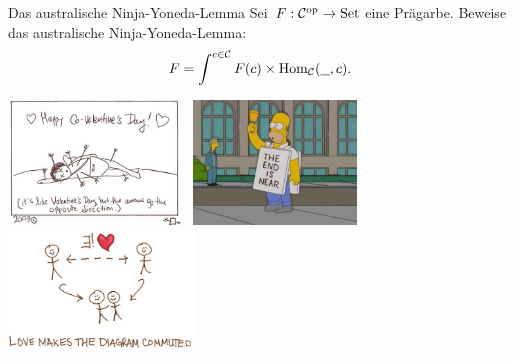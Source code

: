\documentclass{uebblatt}
\begin{document}
\begin{aufgabe}{Das australische Ninja-Yoneda-Lemma}
Sei~$F : \mathcal{C}^{\mathrm{op}} \to \mathrm{Set}$ eine Prägarbe. Beweise das australische
Ninja-Yoneda-Lemma:
\[ F = \int^{c \in \mathcal{C}} F(c) \times \mathrm{Hom}_{\mathcal{C}}(\underline{\ \ }, c). \]
%
\end{aufgabe}

\vspace{-1em}
\centering
\href{https://topologicalmusings.wordpress.com/2009/02/14/happy-co-valentines-day/}{\includegraphics[height=3.3cm]{images/happy-co-valentine}}
\
\includegraphics[height=3.3cm]{images/homer-the-end}
\
\href{http://brownsharpie.courtneygibbons.org/?p=1253}{\includegraphics[height=3.3cm]{images/love-commute}}
\par
\end{document}
